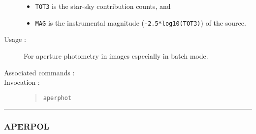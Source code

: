 \begin{description}
\begin{itemize}
\item {\tt TOT3} is the star-sky contribution counts, and 

\item {\tt MAG} is the instrumental magnitude ({\tt -2.5*log10(TOT3)}) of the
source.

\end{itemize}

\item[Usage :] For aperture photometry in images especially in batch
mode.
\item[Associated commands :] {\tt {}}
\item[Invocation :]

\begin{quote}{\tt  aperphot }\end{quote}

\end{description}

\hrule 
\subsubsection*{\label{APERPOL}APERPOL}

